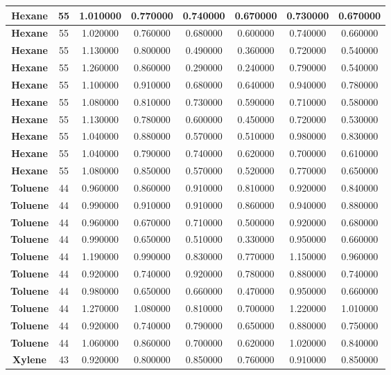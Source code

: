 \documentclass{amsart}
\begin{document}
\begin{center}
\begin{tabular}{c|c|c|c|c|c|c|c}
\textbf{Hexane}& 55&1.010000&0.770000&0.740000&0.670000&0.730000&0.670000 \\ \hline 
\textbf{Hexane}& 55&1.020000&0.760000&0.680000&0.600000&0.740000&0.660000 \\ \hline 
\textbf{Hexane}& 55&1.130000&0.800000&0.490000&0.360000&0.720000&0.540000 \\ \hline 
\textbf{Hexane}& 55&1.260000&0.860000&0.290000&0.240000&0.790000&0.540000 \\ \hline 
\textbf{Hexane}& 55&1.100000&0.910000&0.680000&0.640000&0.940000&0.780000 \\ \hline 
\textbf{Hexane}& 55&1.080000&0.810000&0.730000&0.590000&0.710000&0.580000 \\ \hline 
\textbf{Hexane}& 55&1.130000&0.780000&0.600000&0.450000&0.720000&0.530000 \\ \hline 
\textbf{Hexane}& 55&1.040000&0.880000&0.570000&0.510000&0.980000&0.830000 \\ \hline 
\textbf{Hexane}& 55&1.040000&0.790000&0.740000&0.620000&0.700000&0.610000 \\ \hline 
\textbf{Hexane}& 55&1.080000&0.850000&0.570000&0.520000&0.770000&0.650000 \\ \hline 
\textbf{Toluene}& 44&0.960000&0.860000&0.910000&0.810000&0.920000&0.840000 \\ \hline 
\textbf{Toluene}& 44&0.990000&0.910000&0.910000&0.860000&0.940000&0.880000 \\ \hline 
\textbf{Toluene}& 44&0.960000&0.670000&0.710000&0.500000&0.920000&0.680000 \\ \hline 
\textbf{Toluene}& 44&0.990000&0.650000&0.510000&0.330000&0.950000&0.660000 \\ \hline 
\textbf{Toluene}& 44&1.190000&0.990000&0.830000&0.770000&1.150000&0.960000 \\ \hline 
\textbf{Toluene}& 44&0.920000&0.740000&0.920000&0.780000&0.880000&0.740000 \\ \hline 
\textbf{Toluene}& 44&0.980000&0.650000&0.660000&0.470000&0.950000&0.660000 \\ \hline 
\textbf{Toluene}& 44&1.270000&1.080000&0.810000&0.700000&1.220000&1.010000 \\ \hline 
\textbf{Toluene}& 44&0.920000&0.740000&0.790000&0.650000&0.880000&0.750000 \\ \hline 
\textbf{Toluene}& 44&1.060000&0.860000&0.700000&0.620000&1.020000&0.840000 \\ \hline 
\textbf{Xylene}& 43&0.920000&0.800000&0.850000&0.760000&0.910000&0.850000 \\ \hline 

\end{tabular}
\end{center}
\end{document}

